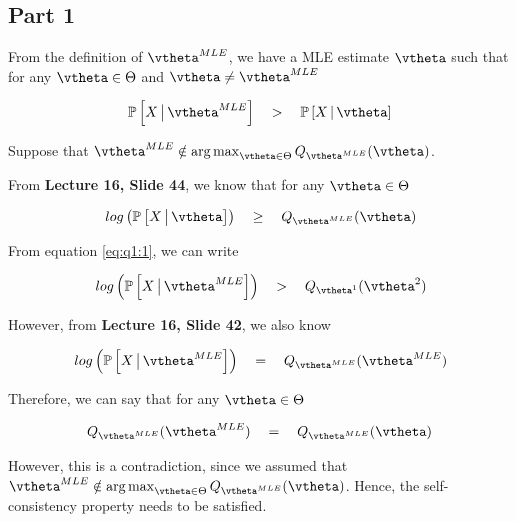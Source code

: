 \documentclass{article}
\begin{document}
\setlength\parindent{0pt}


\begin{mlsolution}

	\subsection*{Part 1}
	\begin{addmargin}{1.5em}

		From the definition of $\vtheta^{MLE}$, we have a MLE estimate $\vtheta$ such that for any $\vtheta \in \Theta$ and $\vtheta \ne \vtheta^{MLE}$

		\begin{equation}
			\prob{X \pipe \vtheta^{MLE}}	\qgt	\prob{X \cond \vtheta}
			\label{eq:q1:1}
		\end{equation} \br%

		Suppose that $\vtheta^{MLE} \notin \argmax_{\vtheta \in \Theta} Q_{\vtheta^{MLE}}(\vtheta)$. \br%

		From \textbf{Lecture 16, Slide 44}, we know that for any $\vtheta \in \Theta$

		\begin{align*}
			\log{\prob{X \pipe \vtheta}}	\qge	Q_{\vtheta^{MLE}}(\vtheta)
		\end{align*} \br%

		From equation \ref{eq:q1:1}, we can write

		\begin{align*}
			\log{\prob{X \pipe \vtheta^{MLE}}}	\qgt	Q_{\vtheta^{1}}(\vtheta^2)
		\end{align*} \br%

		However, from \textbf{Lecture 16, Slide 42}, we also know

		\begin{align*}
			\log{\prob{X \pipe \vtheta^{MLE}}}	\eq		Q_{\vtheta^{MLE}}(\vtheta^{MLE})
		\end{align*} \br%

		Therefore, we can say that for any $\vtheta \in \Theta$

		\begin{align*}
			Q_{\vtheta^{MLE}}(\vtheta^{MLE})	\eq		Q_{\vtheta^{MLE}}(\vtheta)
		\end{align*} \br%

		However, this is a contradiction, since we assumed that $\vtheta^{MLE} \notin \argmax_{\vtheta \in \Theta} Q_{\vtheta^{MLE}}(\vtheta)$. Hence, the self-consistency property needs to be satisfied.


\end{addmargin}
\end{mlsolution}
\end{document}
